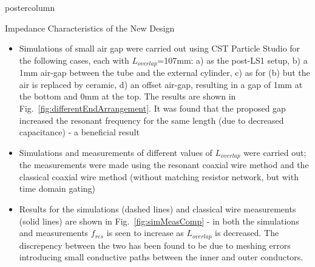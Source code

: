 \documentclass[final,hyperref={pdfpagelabels=false}]{beamer}
\begin{document}
\begin{frame}
\begin{columns}
\begin{column}{.49\textwidth}
\begin{beamercolorbox}[center,wd=\textwidth]{postercolumn}
\begin{minipage}[T]{.95\textwidth}
{\begin{block}{Impedance Characteristics of the New Design}
\begin{figure}
\end{figure}

\begin{itemize}
\item{Simulations of small air gap were carried out using CST Particle Studio for the following cases, each with $L_{overlap}$=107mm: a) as the post-LS1 setup, b) a 1mm air-gap between the tube and the external cylinder, c) as for (b) but the air is replaced by ceramic, d) an offset air-gap, resulting in a gap of 1mm at the bottom and 0mm at the top. The results are shown in Fig.~\ref{fig:differentEndArrangement}. It was found that the proposed gap increased the resonant frequency for the same length (due to decreased capacitance) - a beneficial result}
\item{Simulations and measurements of different values of $L_{overlap}$ were carried out; the measurements were made using the resonant coaxial wire method and the classical coaxial wire method (without matching resistor network, but with time domain gating)}
\item{Results for the simulations (dashed lines) and classical wire measurements (solid lines) are shown in Fig.~\ref{fig:simMeasComp} - in both the simulations and measurements $f_{res}$ is seen to increase as $L_{overlap}$ is decreased. The discrepency between the two has been found to be due to meshing errors introducing small conductive paths between the inner and outer conductors.}
\end{itemize}


\end{block}}
\end{minipage}
\end{beamercolorbox}
\end{column}
\end{columns}
\end{frame}
\end{document}
